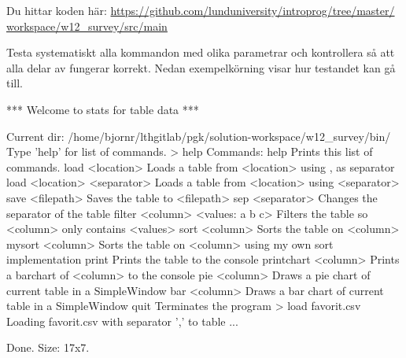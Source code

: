 \noindent Du hittar koden här:
\href{https://github.com/lunduniversity/introprog/tree/master/workspace/w12_survey/src/main}{https://github.com/lunduniversity/introprog/tree/master/\\workspace/w12\_survey/src/main}




\Task Testa systematiskt alla kommandon med olika parametrar och kontrollera så att alla delar av  fungerar korrekt. Nedan exempelkörning visar hur testandet kan gå till.

\begin{REPLnonum}
*** Welcome to stats for table data ***

Current dir: /home/bjornr/lthgitlab/pgk/solution-workspace/w12_survey/bin/
Type 'help' for list of commands.
> help
Commands: help
             Prints this list of commands.
          load <location>
             Loads a table from <location> using , as separator
          load <location> <separator>
             Loads a table from <location> using <separator>
          save <filepath>
             Saves the table to <filepath>
          sep <separator>
             Changes the separator of the table
          filter <column> <values: a b c>
             Filters the table so <column> only contains <values>
          sort <column>
             Sorts the table on <column>
          mysort <column>
             Sorts the table on <column> using my own sort implementation
          print
             Prints the table to the console
          printchart <column>
             Prints a barchart of <column> to the console
          pie <column>
             Draws a pie chart of current table in a SimpleWindow
          bar <column>
             Draws a bar chart of current table in a SimpleWindow
          quit
             Terminates the program
> load favorit.csv
Loading favorit.csv with separator ',' to table ...

Done. Size: 17x7.


\end{REPLnonum}
